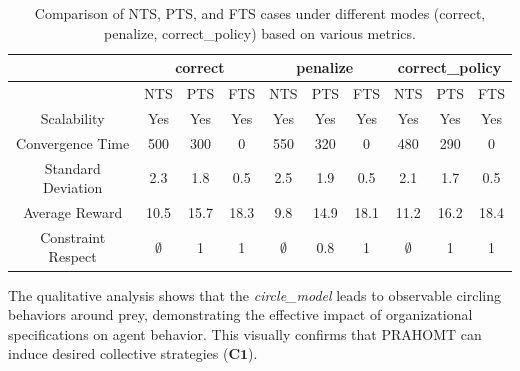 \documentclass[runningheads]{llncs}
\theoremstyle{freethm}
\theoremstyle{proofoutline}
\begin{document}
\begin{table}[h!]
    \centering
    \setlength{\tabcolsep}{5pt}
    \begin{tabular}{cccccccccc}
        \hline
                           & \multicolumn{3}{c}{correct} & \multicolumn{3}{c}{penalize} & \multicolumn{3}{c}{correct\_policy}                                                         \\
        \hline
                           & NTS                         & PTS                          & FTS                                 & NTS         & PTS  & FTS  & NTS         & PTS  & FTS  \\
        \hline
        Scalability        & Yes                         & Yes                          & Yes                                 & Yes         & Yes  & Yes  & Yes         & Yes  & Yes  \\
        Convergence Time   & 500                         & 300                          & 0                                   & 550         & 320  & 0    & 480         & 290  & 0    \\
        Standard Deviation & 2.3                         & 1.8                          & 0.5                                 & 2.5         & 1.9  & 0.5  & 2.1         & 1.7  & 0.5  \\
        Average Reward     & 10.5                        & 15.7                         & 18.3                                & 9.8         & 14.9 & 18.1 & 11.2        & 16.2 & 18.4 \\
        Constraint Respect & $\emptyset$                 & 1                            & 1                                   & $\emptyset$ & 0.8  & 1    & $\emptyset$ & 1    & 1    \\
        \hline
    \end{tabular}
    \caption{Comparison of NTS, PTS, and FTS cases under different modes (correct, penalize, correct\_policy) based on various metrics.}
    \label{tab:results}
\end{table}


The qualitative analysis shows that the \textit{circle\_model} leads to observable circling behaviors around prey, demonstrating the effective impact of organizational specifications on agent behavior. This visually \footnotemark[2] confirms that PRAHOMT can induce desired collective strategies ($\mathbf{C1}$).

\end{document}
